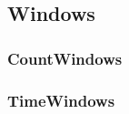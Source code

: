 \subsection{Windows}
\label{sect:windows}

\subsubsection{CountWindows}

\subsubsection{TimeWindows}